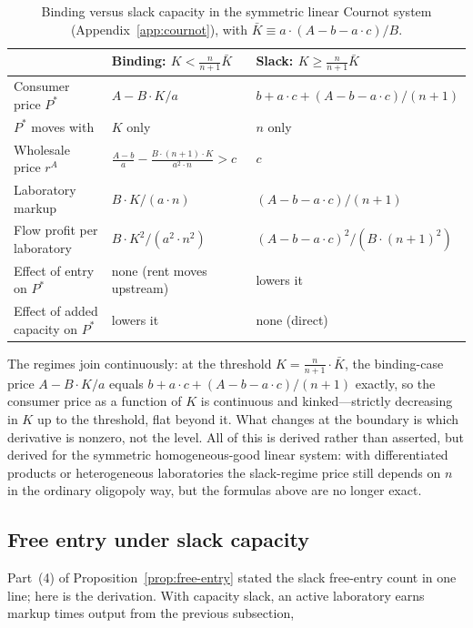 \documentclass[11pt]{article}
\begin{document}
\begin{table}[htbp]
\centering
\caption{Binding versus slack capacity in the symmetric linear Cournot system (Appendix~\ref{app:cournot}), with $\bar K\equiv a\cdot(A-b-a\cdot c)/B$.}
\label{tab:regime-contrast}
\begin{tabular}{lll}
\hline
 & Binding: $K<\frac{n}{n+1}\bar K$ & Slack: $K\geq\frac{n}{n+1}\bar K$ \\
\hline
Consumer price $P^*$ & $A-B\cdot K/a$ & $b+a\cdot c+(A-b-a\cdot c)/(n+1)$ \\
$P^*$ moves with & $K$ only & $n$ only \\
Wholesale price $r^A$ & $\frac{A-b}{a}-\frac{B\cdot(n+1)\cdot K}{a^{2}\cdot n}>c$ & $c$ \\
Laboratory markup & $B\cdot K/(a\cdot n)$ & $(A-b-a\cdot c)/(n+1)$ \\
Flow profit per laboratory & $B\cdot K^{2}/(a^{2}\cdot n^{2})$ & $(A-b-a\cdot c)^{2}/(B\cdot(n+1)^{2})$ \\
Effect of entry on $P^*$ & none (rent moves upstream) & lowers it \\
Effect of added capacity on $P^*$ & lowers it & none (direct) \\
\hline
\end{tabular}
\end{table}

The regimes join continuously: at the threshold $K=\frac{n}{n+1}\cdot\bar K$, the binding-case price $A-B\cdot K/a$ equals $b+a\cdot c+(A-b-a\cdot c)/(n+1)$ exactly, so the consumer price as a function of $K$ is continuous and kinked---strictly decreasing in $K$ up to the threshold, flat beyond it. What changes at the boundary is which derivative is nonzero, not the level. All of this is derived rather than asserted, but derived for the symmetric homogeneous-good linear system: with differentiated products or heterogeneous laboratories the slack-regime price still depends on $n$ in the ordinary oligopoly way, but the formulas above are no longer exact.

\subsection{Free entry under slack capacity}
\label{subsec:slack-free-entry}

Part~(4) of Proposition~\ref{prop:free-entry} stated the slack free-entry count in one line; here is the derivation. With capacity slack, an active laboratory earns markup times output from the previous subsection,
\end{document}
